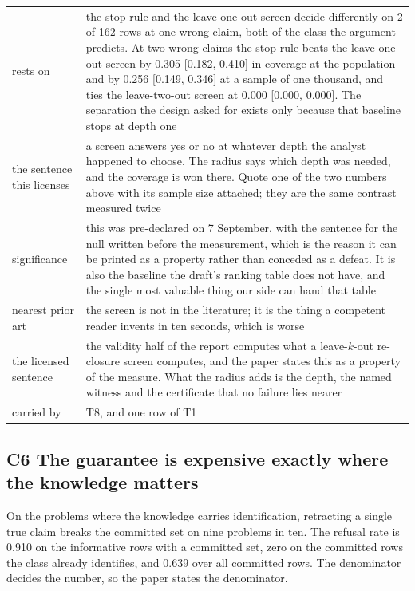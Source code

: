 \begin{center}\footnotesize
\begin{tabular}{@{}p{2.6cm}p{13.75cm}@{}}
\toprule
rests on & the stop rule and the leave-one-out screen decide differently on 2 of 162 rows at one
wrong claim, both of the class the argument predicts. At two wrong claims the stop rule beats the
leave-one-out screen by 0.305 [0.182, 0.410] in coverage at the population and by
0.256 [0.149, 0.346] at a sample of one thousand, and ties the leave-two-out screen at
0.000 [0.000, 0.000]. The separation the design asked for exists only because that baseline stops
at depth one \\
the sentence this licenses & a screen answers yes or no at whatever depth the analyst happened to
choose. The radius says which depth was needed, and the coverage is won there. Quote one of the two
numbers above with its sample size attached; they are the same contrast measured twice \\
significance & this was pre-declared on 7 September, with the sentence for the null written before
the measurement, which is the reason it can be printed as a property rather than conceded as a
defeat. It is also the baseline the draft's ranking table does not have, and the single most
valuable thing our side can hand that table \\
nearest prior art & the screen is not in the literature; it is the thing a competent reader
invents in ten seconds, which is worse \\
the licensed sentence & the validity half of the report computes what a leave-$k$-out re-closure
screen computes, and the paper states this as a property of the measure. What the radius adds is
the depth, the named witness and the certificate that no failure lies nearer \\
carried by & T8, and one row of T1 \\
\bottomrule
\end{tabular}
\end{center}

\subsection*{C6 \quad The guarantee is expensive exactly where the knowledge matters}

On the problems where the knowledge carries identification, retracting a single true claim breaks
the committed set on nine problems in ten. The refusal rate is 0.910 on the informative rows with a
committed set, zero on the committed rows the class already identifies, and 0.639 over all
committed rows. The denominator decides the number, so the paper states the denominator.

